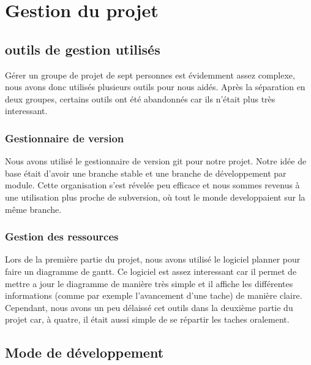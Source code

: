 \chapter{Gestion du projet}

\section{outils de gestion utilisés}

Gérer un groupe de projet de sept personnes est évidemment assez complexe, nous avons donc utilisés plusieurs outils pour nous aidés. Après la séparation en deux groupes, certains outils ont été abandonnés car ils n'était plus très interessant.

\subsection{Gestionnaire de version}

Nous avons utilisé le gestionnaire de version git pour notre projet. Notre idée de base était d'avoir une branche stable et une branche de développement par module. Cette organisation s'est révelée peu efficace et nous sommes revenus à une utilisation plus proche de subversion, où tout le monde developpaient sur la même branche. 

\subsection{Gestion des ressources}

Lors de la première partie du projet, nous avons utilisé le logiciel planner pour faire un diagramme de gantt. Ce logiciel est assez interessant car il permet de mettre a jour le diagramme de manière très simple et il affiche les différentes informations (comme par exemple l'avancement d'une tache) de manière claire.
Cependant, nous avons un peu délaissé cet outils dans la deuxième partie du projet car, à quatre, il était aussi simple de se répartir les taches oralement.

\section{Mode de développement}


